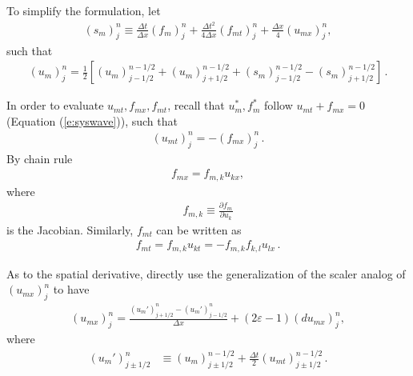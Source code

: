 \documentclass[11pt,dvips]{article}
\numberwithin{equation}{section}
\begin{document}
To simplify the formulation, let
\begin{align}
  (s_m)_j^n \equiv \frac{\Delta t}{\Delta x}(f_m)_j^n
    + \frac{\Delta t^2}{4\Delta x}(f_{mt})_j^n
    + \frac{\Delta x}{4}(u_{mx})_j^n, \label{e:sm}
\end{align}
such that
\begin{align*}
  (u_m)_j^n = \frac{1}{2}\left[
      (u_m)_{j-1/2}^{n-1/2} + (u_m)_{j+1/2}^{n-1/2}
    + (s_m)_{j-1/2}^{n-1/2} - (s_m)_{j+1/2}^{n-1/2}
    \right]\,.
\end{align*}

In order to evaluate $u_{mt}, f_{mx}, f_{mt}$, recall that $u_m^*, f_m^*$
follow $u_{mt}+f_{mx}=0$ (Equation (\ref{e:syswave})), such
that
\begin{align}
  (u_{mt})_j^n = -(f_{mx})_j^n\,. \label{e:sysumt}
\end{align}
By chain rule
\begin{align}
  f_{mx} = f_{m,k}u_{kx}, \label{e:sysfmk}
\end{align}
where
\begin{align}
  f_{m,k} \equiv \frac{\partial f_m}{\partial u_k} \label{e:sysjacobian}
\end{align}
is the Jacobian.
Similarly, $f_{mt}$ can be written as
\begin{align}
  f_{mt} = f_{m,k}u_{kt} = -f_{m,k}f_{k,l}u_{lx}\,. \label{e:sysfmt}
\end{align}

As to the spatial derivative, directly use the generalization of the
scaler analog of $(u_{mx})_j^n$ to have
\begin{align*}
  (u_{mx})_j^n = \frac{(u_m')_{j+1/2}^n-(u_m')_{j-1/2}^n}{\Delta x}
    + (2\varepsilon-1)(du_{mx})_j^n,
\end{align*}
where
\begin{align}
  (u_m')_{j\pm1/2}^n &\equiv
      (u_m)_{j\pm1/2}^{n-1/2}
    + \frac{\Delta t}{2}(u_{mt})_{j\pm1/2}^{n-1/2}\,. \label{e:ump}
\end{align}
\end{document}
